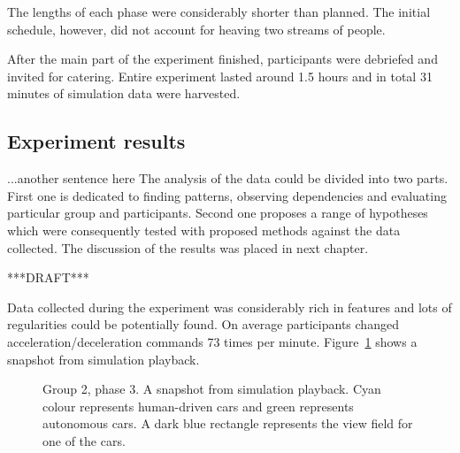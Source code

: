 \documentclass[11pt,english]{article}
\begin{document}
The lengths of each phase were considerably shorter than planned. The initial schedule, however, did not account for heaving two streams of people. 


After the main part of the experiment finished, participants were debriefed and invited for catering. Entire experiment lasted around 1.5 hours and in total 31 minutes of simulation data were harvested.



\subsection{Experiment results}

...another sentence here
The analysis of the data could be divided into two parts. First one is dedicated to finding patterns, observing dependencies and evaluating particular group and participants. Second one proposes a range of hypotheses which were consequently tested with proposed methods against the data collected. The discussion of the results was placed in next chapter.

***DRAFT***

Data collected during the experiment was considerably rich in features and lots of regularities could be potentially found. On average participants changed acceleration/deceleration commands 73 times per minute. 
Figure~\ref{fig:sample_snapshot} shows a snapshot from simulation playback.  
 
 
\begin{figure}[h] %
\caption{Group 2, phase 3. A snapshot from simulation playback. Cyan colour represents human-driven cars and green represents autonomous cars. A dark blue rectangle represents the view field for one of the cars.}
\label{fig:sample_snapshot}
\end{figure} 
 
\end{document}
